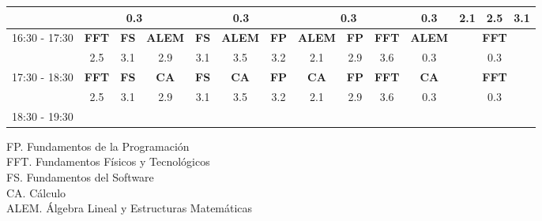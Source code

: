 \documentclass[10pt,spanish, landscape]{article}
\begin{document}
\begin{minipage}{0.7\textwidth}
\begin{tabular}{|c|ccc|ccc|ccc|ccc|ccc|}
& \multicolumn{3}{|c|}{ \cellcolor{grisclaro} {\footnotesize 0.3}}& \multicolumn{3}{|c|}{ \cellcolor{grisclaro} {\footnotesize 0.3}}& \multicolumn{3}{|c|}{ \cellcolor{grisclaro} {\footnotesize 0.3}}& \multicolumn{3}{|c|}{ \cellcolor{grisclaro} {\footnotesize 0.3}} & {\footnotesize 2.1} & {\footnotesize 2.5} & {\footnotesize 3.1}\\ 
 \hline
\multirow{2}{*}{16:30 - 17:30}  & \textbf{FFT} & \textbf{FS} & \textbf{ALEM} & \textbf{FS} & \textbf{ALEM} & \textbf{FP} & \textbf{ALEM} & \textbf{FP} & \textbf{FFT}& \multicolumn{3}{|c|}{ \cellcolor{grisclaro} \textbf{ALEM}}& \multicolumn{3}{|c|}{ \cellcolor{grisclaro} \textbf{FFT}}\\ 
 & {\footnotesize 2.5} & {\footnotesize 3.1} & {\footnotesize 2.9} & {\footnotesize 3.1} & {\footnotesize 3.5} & {\footnotesize 3.2} & {\footnotesize 2.1} & {\footnotesize 2.9} & {\footnotesize 3.6}& \multicolumn{3}{|c|}{ \cellcolor{grisclaro} {\footnotesize 0.3}}& \multicolumn{3}{|c|}{ \cellcolor{grisclaro} {\footnotesize 0.3}}\\ 
 \hline
\multirow{2}{*}{17:30 - 18:30}  & \textbf{FFT} & \textbf{FS} & \textbf{CA} & \textbf{FS} & \textbf{CA} & \textbf{FP} & \textbf{CA} & \textbf{FP} & \textbf{FFT}& \multicolumn{3}{|c|}{ \cellcolor{grisclaro} \textbf{CA}}& \multicolumn{3}{|c|}{ \cellcolor{grisclaro} \textbf{FFT}}\\ 
 & {\footnotesize 2.5} & {\footnotesize 3.1} & {\footnotesize 2.9} & {\footnotesize 3.1} & {\footnotesize 3.5} & {\footnotesize 3.2} & {\footnotesize 2.1} & {\footnotesize 2.9} & {\footnotesize 3.6}& \multicolumn{3}{|c|}{ \cellcolor{grisclaro} {\footnotesize 0.3}}& \multicolumn{3}{|c|}{ \cellcolor{grisclaro} {\footnotesize 0.3}}\\ 
 \hline
\multirow{2}{*}{18:30 - 19:30}  &  &  &  &  &  &  &  &  &  &  &  &  &  &  & \\ 
 &  &  &  &  &  &  &  &  &  &  &  &  &  &  & \\ 
 \hline

\end{tabular}
\end{minipage}
\begin{minipage}{0.25\textwidth}
FP. Fundamentos de la Programación\\[0.5cm]
FFT. Fundamentos Físicos y Tecnológicos\\[0.5cm]
FS. Fundamentos del Software\\[0.5cm]
CA. Cálculo\\[0.5cm]
ALEM. Álgebra Lineal y Estructuras Matemáticas\\[0.5cm]
\end{minipage}
\newpage
\end{document}
